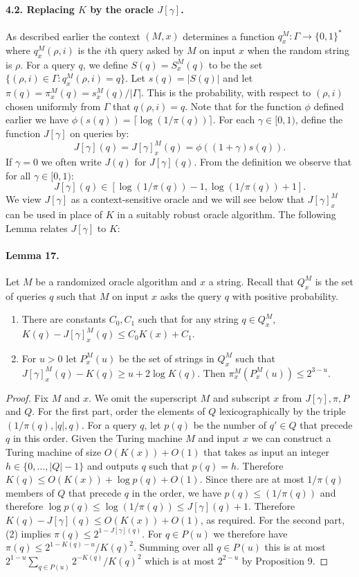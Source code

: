 \documentclass[10pt,a4paper]{article}
\begin{document}
\paragraph{4.2. Replacing $K$ by the oracle $J[\gamma]$.}
As described earlier the context $(M,x)$ determines a function $q_x^M:\Gamma\to\{0,1\}^*$ where $q_x^M(\rho,i)$ is the $i$th query asked by $M$ on input $x$ when the random string is $\rho$.
For a query $q$, we define $S(q)=S_x^M(q)$ to be the set $\{(\rho,i)\in\Gamma:q_x^M(\rho,i)=q\}$.
Let $s(q)=|S(q)|$ and let $\pi(q)=\pi_x^M(q)=s_x^M(q)/|\Gamma|$. This is the probability, with respect to $(\rho,i)$ chosen uniformly from $\Gamma$ that $q(\rho,i)=q$. Note that for the function $\phi$ defined earlier we have $\phi(s(q))=\lceil\log(1/\pi(q))\rceil$.
For each $\gamma\in[0,1)$, define the function $J[\gamma]$ on queries by:
\[J[\gamma](q)=J[\gamma]_x^M(q)=\phi((1+\gamma)s(q)).\]
If $\gamma=0$ we often write $J(q)$ for $J[\gamma](q)$. From the definition we observe that for all $\gamma\in[0,1)$:
\[J[\gamma](q)\in[\log(1/\pi(q))-1,\log(1/\pi(q))+1].\tag{2}\]
We view $J[\gamma]$ as a context-sensitive oracle and we will see below that $J[\gamma]_x^M$ can be used in place of $K$ in a suitably robust oracle algorithm. The following Lemma relates $J[\gamma]$ to $K$:
\paragraph{Lemma 17.}
Let $M$ be a randomized oracle algorithm and $x$ a string. Recall that $Q_x^M$ is the set of queries $q$ such that $M$ on input $x$ asks the query $q$ with positive probability.
\begin{enumerate}
\item There are constants $C_0,C_1$ such that for any string $q\in Q_x^M$, $K(q)-J[\gamma]_x^M(q)\leq C_0K(x)+C_1$.
\item For $u>0$ let $P_x^M(u)$ be the set of strings in $Q_x^M$ such that $J[\gamma]_x^M(q)-K(q)\geq u+2\log K(q)$. Then $\pi_x^M(P_x^M(u))\leq2^{3-u}$.
\end{enumerate}
\begin{proof}
Fix $M$ and $x$. We omit the superscript $M$ and subscript $x$ from $J[\gamma],\pi,P$ and $Q$.
For the first part, order the elements of $Q$ lexicographically by the triple $(1/\pi(q),|q|,q)$. For a query $q$, let $p(q)$ be the number of $q'\in Q$ that precede $q$ in this order. Given the Turing machine $M$ and input $x$ we can construct a Turing machine of size $O(K(x))+O(1)$ that takes as input an integer $h\in\{0,\ldots,|Q|-1\}$ and outputs $q$ such that $p(q)=h$.
Therefore $K(q)\leq O(K(x))+\log p(q)+O(1)$. Since there are at most $1/\pi(q)$ members of $Q$ that precede $q$ in the order, we have $p(q)\leq(1/\pi(q))$ and therefore $\log p(q)\leq\log(1/\pi(q))\leq J[\gamma](q)+1$. Therefore $K(q)-J[\gamma](q)\leq O(K(x))+O(1)$, as required.
For the second part, (2) implies $\pi(q)\leq2^{1-J[\gamma](q)}$. For $q\in P(u)$ we therefore have $\pi(q)\leq2^{1-K(q)-u}/K(q)^2$. Summing over all $q\in P(u)$ this is at most $2^{1-u}\sum_{q\in P(u)}2^{-K(q)}/K(q)^2$ which is at most $2^{2-u}$ by Proposition 9.
\end{proof}
\end{document}
